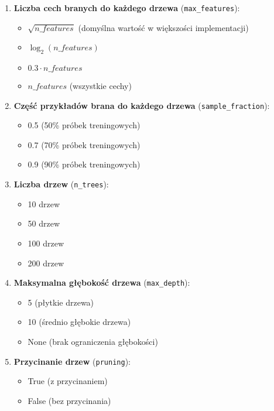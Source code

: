 \documentclass[12pt,a4paper]{article}
\begin{document}
\begin{enumerate}
    \item \textbf{Liczba cech branych do każdego drzewa} (\texttt{max\_features}):
    \begin{itemize}
        \item $\sqrt{n\_features}$ (domyślna wartość w większości implementacji)
        \item $\log_2(n\_features)$
        \item $0.3 \cdot n\_features$
        \item $n\_features$ (wszystkie cechy)
    \end{itemize}

    \item \textbf{Część przykładów brana do każdego drzewa} (\texttt{sample\_fraction}):
    \begin{itemize}
        \item 0.5 (50\% próbek treningowych)
        \item 0.7 (70\% próbek treningowych)
        \item 0.9 (90\% próbek treningowych)
    \end{itemize}

    \item \textbf{Liczba drzew} (\texttt{n\_trees}):
    \begin{itemize}
        \item 10 drzew
        \item 50 drzew
        \item 100 drzew
        \item 200 drzew
    \end{itemize}

    \item \textbf{Maksymalna głębokość drzewa} (\texttt{max\_depth}):
    \begin{itemize}
        \item 5 (płytkie drzewa)
        \item 10 (średnio głębokie drzewa)
        \item None (brak ograniczenia głębokości)
    \end{itemize}

    \item \textbf{Przycinanie drzew} (\texttt{pruning}):
    \begin{itemize}
        \item True (z przycinaniem)
        \item False (bez przycinania)
    \end{itemize}


\end{enumerate}
\end{document}
